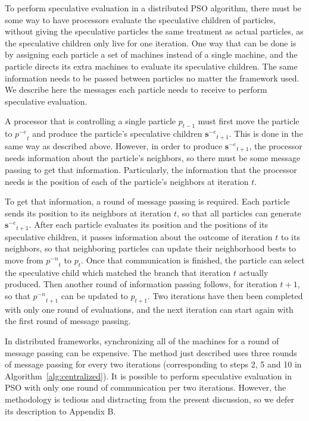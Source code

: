 \documentclass[smallcondensed]{svjour3}
\newcommand{\alg}[1]{Algorithm~\ref{alg:#1}}
\providecommand{\noeval}[1]{\ensuremath{#1^{-e}}}
\providecommand{\nonbest}[1]{\ensuremath{#1^{-n}}}
\providecommand{\p}{\ensuremath{p}}
\providecommand{\sset}{\ensuremath{\mathbf{s}}}
\begin{document}
To perform speculative evaluation in a distributed PSO algorithm, there must be
some way to have processors evaluate the speculative children of particles,
without giving the speculative particles the same treatment as actual
particles, as the speculative children only live for one iteration.  One way
that can be done is by assigning each particle a set of machines instead of a
single machine, and the particle directs its extra machines to evaluate its
speculative children.  The same information needs to be passed between
particles no matter the framework used.  We describe here the messages each
particle needs to receive to perform speculative evaluation.

A processor that is controlling a single particle $\p_{t-1}$ must first move
the particle to $\noeval{\p}_t$ and produce the particle's speculative children
$\noeval{\sset}_{t+1}$.  This is done in the same way as described above.
However, in order to produce $\noeval{\sset}_{t+1}$, the processor needs
information about the particle's neighbors, so there must be some message
passing to get that information.  Particularly, the information that the
processor needs is the position of each of the particle's neighbors at
iteration $t$.

To get that information, a round of message passing is required.  Each particle
sends its position to its neighbors at iteration $t$, so that all particles can
generate $\noeval{\sset}_{t+1}$.  After each particle evaluates its position
and the positions of its speculative children, it passes information about the
outcome of iteration $t$ to its neighbors, so that neighboring particles can
update their neighborhood bests to move from $\nonbest{\p}_t$ to $\p_t$.  Once
that communication is finished, the particle can select the speculative child
which matched the branch that iteration $t$ actually produced.  Then another
round of information passing follows, for iteration $t+1$, so that
$\nonbest{\p}_{t+1}$ can be updated to $\p_{t+1}$.  Two iterations have then
been completed with only one round of evaluations, and the next iteration can
start again with the first round of message passing.

In distributed frameworks, synchronizing all of the machines for a round of
message passing can be expensive.  The method just described uses three rounds
of message passing for every two iterations (corresponding to steps 2, 5 and 10
in \alg{centralized}).  It is possible to perform speculative evaluation in PSO
with only one round of communication per two iterations.  However, the
methodology is tedious and distracting from the present discussion, so we defer
its description to Appendix B.
\end{document}
